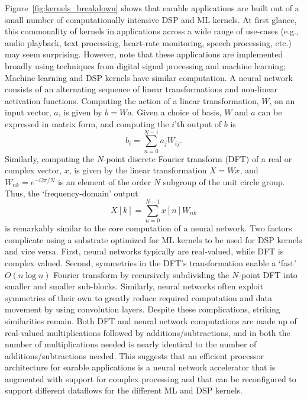 Figure~\ref{fig:kernels_breakdown} shows that earable applications are
built out of a small number of computationally intensive DSP and ML
kernels.  At first glance, this commonality of kernels in applications
across  a wide range of use-cases (e.g., audio playback, text processing,
heart-rate monitoring, speech processing, etc.) may seem surprising.
However, note that these applications are implemented broadly using techniques from digital signal processing and machine learning; 
Machine learning and DSP kernels have similar computation.
A neural network consists of an alternating sequence of linear transformations and non-linear activation functions. Computing the action of a linear transformation, $W$, on an input vector, $a$, is given by $b = Wa$.  Given a choice of basis, $W$ and $a$ can be expressed in matrix form, and computing the $i$'th output of $b$ is
\begin{equation}
    b_i = \sum_{n=0}^{N-1} a_jW_{ij}.
\end{equation}
Similarly, computing the $N$-point discrete Fourier transform (DFT) of a real or complex vector, $x$, is given by the linear transformation $X = Wx$, and $W_{nk} = e^{-i2\pi/N}$ is an element of the order $N$ subgroup of the unit circle group.
Thus, the `frequency-domain' output
\begin{equation}
   X[k] = \sum_{n=0}^{N-1} x[n] W_{nk}
\end{equation}
is remarkably similar to the core computation of a neural network.
Two factors complicate using a substrate optimized for ML kernels to be used for DSP kernels and vice versa. First, neural networks typically are real-valued, while DFT is complex valued.  Second, symmetries in the DFT's transformation enable a `fast' $O(n\log n)$ Fourier transform by recursively subdividing the $N$-point DFT into smaller and smaller sub-blocks.  Similarly, neural networks often exploit symmetries of their own to greatly reduce required computation and data movement by using convolution layers.
Despite these complications, striking similarities remain.  Both DFT and neural network computations are made up of real-valued multiplications followed by additions/subtractions, and in both the number of multiplications needed is nearly identical to the number of additions/subtractions needed. This suggests that an efficient processor architecture for earable applications is a neural network accelerator that is augmented with support for complex processing and that can be reconfigured to support different dataflows for the different ML and DSP kernels. 

